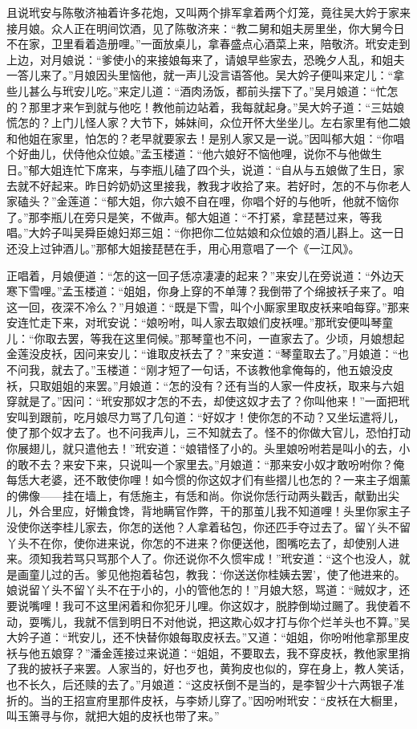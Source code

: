 且说玳安与陈敬济袖着许多花炮，又叫两个排军拿着两个灯笼，竟往吴大妗于家来接月娘。众人正在明间饮酒，见了陈敬济来：“教二舅和姐夫房里坐，你大舅今日不在家，卫里看着造册哩。”一面放桌儿，拿春盛点心酒菜上来，陪敬济。玳安走到上边，对月娘说：“爹使小的来接娘每来了，请娘早些家去，恐晚夕人乱，和姐夫一答儿来了。”月娘因头里恼他，就一声儿没言语答他。吴大妗子便叫来定儿：“拿些儿甚么与玳安儿吃。”来定儿道：“酒肉汤饭，都前头摆下了。”吴月娘道：“忙怎的？那里才来乍到就与他吃！教他前边站着，我每就起身。”吴大妗子道：“三姑娘慌怎的？上门儿怪人家？大节下，姊妹间，众位开怀大坐坐儿。左右家里有他二娘和他姐在家里，怕怎的？老早就要家去！是别人家又是一说。”因叫郁大姐：“你唱个好曲儿，伏侍他众位娘。”孟玉楼道：“他六娘好不恼他哩，说你不与他做生日。”郁大姐连忙下席来，与李瓶儿磕了四个头，说道：“自从与五娘做了生日，家去就不好起来。昨日妗奶奶这里接我，教我才收拾了来。若好时，怎的不与你老人家磕头？”金莲道：“郁大姐，你六娘不自在哩，你唱个好的与他听，他就不恼你了。”那李瓶儿在旁只是笑，不做声。郁大姐道：“不打紧，拿琵琶过来，等我唱。”大妗子叫吴舜臣媳妇郑三姐：“你把你二位姑娘和众位娘的酒儿斟上。这一日还没上过钟酒儿。”那郁大姐接琵琶在手，用心用意唱了一个《一江风》。

正唱着，月娘便道：“怎的这一回子恁凉凄凄的起来？”来安儿在旁说道：“外边天寒下雪哩。”孟玉楼道：“姐姐，你身上穿的不单薄？我倒带了个绵披袄子来了。咱这一回，夜深不冷么？”月娘道：“既是下雪，叫个小厮家里取皮袄来咱每穿。”那来安连忙走下来，对玳安说：“娘吩咐，叫人家去取娘们皮袄哩。”那玳安便叫琴童儿：“你取去罢，等我在这里伺候。”那琴童也不问，一直家去了。少顷，月娘想起金莲没皮袄，因问来安儿：“谁取皮袄去了？”来安道：“琴童取去了。”月娘道：“也不问我，就去了。”玉楼道：“刚才短了一句话，不该教他拿俺每的，他五娘没皮袄，只取姐姐的来罢。”月娘道：“怎的没有？还有当的人家一件皮袄，取来与六姐穿就是了。”因问：“玳安那奴才怎的不去，却使这奴才去了？你叫他来！”一面把玳安叫到跟前，吃月娘尽力骂了几句道：“好奴才！使你怎的不动？又坐坛遣将儿，使了那个奴才去了。也不问我声儿，三不知就去了。怪不的你做大官儿，恐怕打动你展翅儿，就只遣他去！”玳安道：“娘错怪了小的。头里娘吩咐若是叫小的去，小的敢不去？来安下来，只说叫一个家里去。”月娘道：“那来安小奴才敢吩咐你？俺每恁大老婆，还不敢使你哩！如今惯的你这奴才们有些摺儿也怎的？一来主子烟薰的佛像——挂在墙上，有恁施主，有恁和尚。你说你恁行动两头戳舌，献勤出尖儿，外合里应，好懒食馋，背地瞒官作弊，干的那茧儿我不知道哩！头里你家主子没使你送李桂儿家去，你怎的送他？人拿着毡包，你还匹手夺过去了。留丫头不留丫头不在你，使你进来说，你怎的不进来？你便送他，图嘴吃去了，却使别人进来。须知我若骂只骂那个人了。你还说你不久惯牢成！”玳安道：“这个也没人，就是画童儿过的舌。爹见他抱着毡包，教我：‘你送送你桂姨去罢’，使了他进来的。娘说留丫头不留丫头不在于小的，小的管他怎的！”月娘大怒，骂道：“贼奴才，还要说嘴哩！我可不这里闲着和你犯牙儿哩。你这奴才，脱脖倒坳过颺了。我使着不动，耍嘴儿，我就不信到明日不对他说，把这欺心奴才打与你个烂羊头也不算。”吴大妗子道：“玳安儿，还不快替你娘每取皮袄去。”又道：“姐姐，你吩咐他拿那里皮袄与他五娘穿？”潘金莲接过来说道：“姐姐，不要取去，我不穿皮袄，教他家里捎了我的披袄子来罢。人家当的，好也歹也，黄狗皮也似的，穿在身上，教人笑话，也不长久，后还赎的去了。”月娘道：“这皮袄倒不是当的，是李智少十六两银子准折的。当的王招宣府里那件皮袄，与李娇儿穿了。”因吩咐玳安：“皮袄在大橱里，叫玉箫寻与你，就把大姐的皮袄也带了来。”


